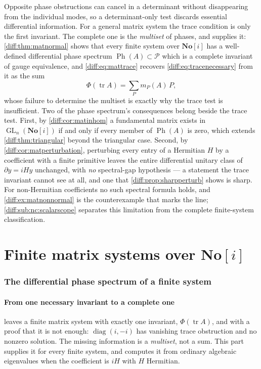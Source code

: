 \documentclass[11pt,letterpaper]{article}
\numberwithin{equation}{section}
\theoremstyle{definition}
\theoremstyle{remark}
\newcommand{\SC}{\mathbf{No}[i]}
\newcommand{\der}{\partial}
\newcommand{\Pcl}{\mathcal P}
\newcommand{\GL}{\operatorname{GL}}
\newcommand{\tr}{\operatorname{tr}}
\newcommand{\Ph}{\operatorname{Ph}}
\begin{document}
Opposite phase obstructions can cancel in a determinant without disappearing
from the individual modes, so a determinant-only test discards essential
differential information. For a general matrix system the trace condition is
only the first invariant. The complete one is the \emph{multiset} of phases,
and \cref{diff:part:matrix} supplies it: \cref{diff:thm:matnormal} shows that
every finite system over $\SC$ has a well-defined differential phase spectrum
$\Ph(A)\subset\Pcl$ which is a complete invariant of gauge equivalence, and
\cref{diff:eq:mattrace} recovers \cref{diff:eq:tracenecessary} from it as the
sum
\[
 \Phi(\tr A)=\sum_{P}m_{P}(A)\,P ,
\]
whose failure to determine the multiset is exactly why the trace test is
insufficient. Two of the phase spectrum's consequences belong beside the trace
test. First, by \cref{diff:cor:matinhom} a fundamental matrix exists in
$\GL_{n}(\SC)$ if and only if every member of $\Ph(A)$ is zero, which extends
\cref{diff:thm:triangular} beyond the triangular case. Second, by
\cref{diff:cor:matperturbation}, perturbing every entry of a Hermitian $H$ by
a coefficient with a finite primitive leaves the entire differential unitary
class of $\der y=iHy$ unchanged, with \emph{no} spectral-gap hypothesis --- a
statement the trace invariant cannot see at all, and one that
\cref{diff:prop:sharpperturb} shows is sharp. For non-Hermitian coefficients no
such spectral formula holds, and \cref{diff:ex:matnonnormal} is the
counterexample that marks the line; \cref{diff:sub:nc:scalarscope} separates
this limitation from the complete finite-system classification.
\part{Finite matrix systems over \texorpdfstring{$\SC$}{No[i]}}
\label{diff:part:matrix}

\section{The differential phase spectrum of a finite system}
\label{diff:sec:matrixphase}

\subsection{From one necessary invariant to a complete one}
\label{diff:sub:matbridge}

 leaves a finite matrix system with exactly one
invariant, $\Phi(\tr A)$, and with a proof that it is not enough:
$\operatorname{diag}(i,-i)$ has vanishing trace obstruction and no nonzero
solution. The missing information is a \emph{multiset}, not a sum. This part
supplies it for every finite system, and computes it from ordinary algebraic
eigenvalues when the coefficient is $iH$ with $H$ Hermitian.
\end{document}
